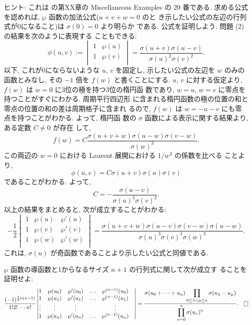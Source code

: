 \documentclass[12pt,twoside]{jarticle}
\def\pe{\wp}
\begin{document}
\noindent ヒント: これは \cite{WW}の第XX章の Miscellaneous Examples の 
20 番である. 求める公式を認めれば, $\pe$ 函数の加法公式($u+v+w=0$ のと
き示したい公式の左辺の行列式が0になること)は $\sigma(0)=0$ より明らか
である. 公式を証明しよう. 問題  (2)の結果を次のように表現する
こともできる:
\[
  \phi(u,v)
  :=
  \begin{vmatrix}
    1 & \pe(u) \\
    1 & \pe(v) \\
  \end{vmatrix}
  =
  \frac{\sigma(u+v)\sigma(u-v)}{\sigma(u)^2\sigma(v)^2}.
\] %
以下, これが0にならないような $u$, $v$ を固定し, 示したい公式の左辺を %
$w$ のみの函数とみなし, その $-1$ 倍を $f(w)$ と書くことにする. %
$u$, $v$ に対する仮定より, $f(w)$ は $w=0$ に3位の極を持つ3位の楕円函
数であり, $w=u$, $w=v$ に零点を持つことがすぐにわかる. 周期平行四辺形
に含まれる楕円函数の極の位置の和と零点の位置の和の差は周期格子に含まれ
るので, $f(w)$ は $w=-u-v$ にも零点を持つことがわかる. よって, 楕円函
数の $\sigma$ 函数による表示に関する結果より, ある定数 $C\ne0$ が存在
して,
\[
  f(w) = C\frac{\sigma(u+v+w)\sigma(u-w)\sigma(v-w)}{\sigma(w)^3}.
\]
この両辺の $w=0$ における Laurent 展開における $1/w^3$ の係数を比べる
ことより,
\[
  \phi(u,v) = C\sigma(u+v)\sigma(u)\sigma(v)
\] %
であることがわかる. よって,
\[
  C = - \frac{\sigma(u-v)}{\sigma(u)^3\sigma(v)^3}.
\]
以上の結果をまとめると, 次が成立することがわかる:
\[
  - \frac{1}{2}
  \begin{vmatrix}
    1 & \pe(u) & \pe'(u) \\
    1 & \pe(v) & \pe'(v) \\
    1 & \pe(w) & \pe'(w) \\
  \end{vmatrix}
  = \frac
  {\sigma(u+v+w)\sigma(u-v)\sigma(v-w)\sigma(u-w)}
  {\sigma(u)^3\sigma(v)^3\sigma(w)^3}.
\]
これは, $\sigma(u)$ が奇函数であることより示したい公式と同値である. %

\begin{question}
  $\pe$ 函数の導函数と1からなるサイズ $n+1$ の行列式に関して次が成立す
  ることを証明せよ:
  \[
    \frac
    {(-1)^{\frac{1}{2}n(n-1)}}
    {1!2!\cdots n!}
    \begin{vmatrix}
      1      & \pe(u_0) & \pe'(u_0) & \hdots & \pe^{(n-1)}(u_0) \\ 
      1      & \pe(u_1) & \pe'(u_1) & \hdots & \pe^{(n-1)}(u_1) \\ 
      \vdots & \vdots   & \vdots    &        & \vdots & \\
      1      & \pe(u_n) & \pe'(u_n) & \hdots & \pe^{(n-1)}(u_n) \\ 
    \end{vmatrix}
    =
    \frac
    {
      \displaystyle
      \sigma(u_0+\cdots+u_n)
      \prod_{0\le\lambda<\mu\le n}\sigma(u_\lambda - u_\mu)
    }{
      \displaystyle
        \prod_{\nu=0}^n \sigma(u_\nu)^n
    }.
  \qed
  \]
\end{question}
\end{document}
